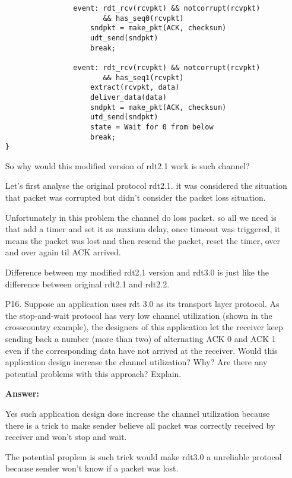 \begin{enumerate}
\begin{lstlisting}
                event: rdt_rcv(rcvpkt) && notcorrupt(rcvpkt)
                       && has_seq0(rcvpkt)
                    sndpkt = make_pkt(ACK, checksum)
                    udt_send(sndpkt)
                    break;

                event: rdt_rcv(rcvpkt) && notcorrupt(rcvpkt)
                       && has_seq1(rcvpkt)
                    extract(rcvpkt, data)
                    deliver_data(data)
                    sndpkt = make_pkt(ACK, checksum)
                    utd_send(sndpkt)
                    state = Wait for 0 from below
                    break;
}

    \end{lstlisting}

    So why would this modified version of rdt2.1 work is such channel?

    Let's first analyse the original protocol rdt2.1.
    it was considered the situation that packet was corrupted but didn't consider the packet loss situation.

    Unfortunately in this problem the channel do loss packet. so all we need is that add a timer and set it as maxium delay, once timeout was triggered, it means the packet was lost and then resend the packet, reset the timer, over and over again til ACK arrived.

    Difference between my modified rdt2.1 version and rdt3.0 is just like the difference between original rdt2.1 and rdt2.2.
    
    \item[P16.] Suppose an application uses rdt 3.0 as its transport layer protocol. As the stop-and-wait protocol has very low channel utilization (shown in the crosscountry example), the designers of this application let the receiver keep sending back a number (more than two) of alternating ACK 0 and ACK 1 even if the corresponding data have not arrived at the receiver. Would this application design increase the channel utilization? Why? Are there any potential problems with this approach? Explain.

    \textbf{Answer: }

    Yes such application design dose increase the channel utilization because there is a trick to make sender believe all packet was correctly received by receiver and won't stop and wait.

    The potential proplem is such trick would make rdt3.0 a unreliable protocol because sender won't know if a packet was lost.
    

\end{enumerate}
